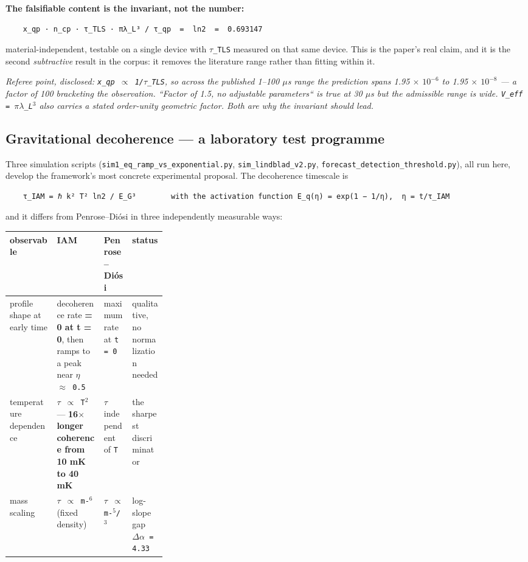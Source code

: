 \documentclass[12pt,a4paper]{article}
\begin{document}
\textbf{The falsifiable content is the invariant, not the number:}


\begin{lstlisting}
    x_qp · n_cp · τ_TLS · πλ_L³ / τ_qp  =  ln2  =  0.693147
\end{lstlisting}


material-independent, testable on a single device with \texttt{$\tau$\_TLS} measured on that same device. This is the paper's real claim, and it is the second \textit{subtractive} result in the corpus: it removes the literature range rather than fitting within it.


\textit{Referee point, disclosed: \texttt{x\_qp $\propto$ 1/$\tau$\_TLS}, so across the published 1--100 $\mu$s range the prediction spans 1.95 $\times$ $10^{-6}$ to 1.95 $\times$ $10^{-8}$ --- a factor of 100 bracketing the observation. ``Factor of 1.5, no adjustable parameters`` is true at 30 $\mu$s but the admissible range is wide. \texttt{V\_eff = $\pi\lambda$\_L$^{3}$} also carries a stated order-unity geometric factor. Both are why the invariant should lead.}







\subsection{Gravitational decoherence --- a laboratory test programme}

Three simulation scripts (\texttt{sim1\_eq\_ramp\_vs\_exponential.py}, \texttt{sim\_lindblad\_v2.py}, \texttt{forecast\_detection\_threshold.py}), all run here, develop the framework's most concrete experimental proposal. The decoherence timescale is


\begin{lstlisting}
    τ_IAM = ℏ k² T² ln2 / E_G³        with the activation function E_q(η) = exp(1 − 1/η),  η = t/τ_IAM
\end{lstlisting}


and it differs from Penrose--Di\'osi in three independently measurable ways:


\begin{small}
\begin{tabularx}{\linewidth}{L{0.30\linewidth}YYY}
\toprule
\textbf{observable} & \textbf{IAM} & \textbf{Penrose--Di\'osi} & \textbf{status} \\
\midrule
profile shape at early time & decoherence rate \textbf{= 0 at t = 0}, then ramps to a peak near \texttt{$\eta$ $\approx$ 0.5} & maximum rate at \texttt{t = 0} & qualitative, no normalization needed \\
temperature dependence & \texttt{$\tau$ $\propto$ T$^{2}$} --- \textbf{16$\times$ longer coherence from 10 mK to 40 mK} & \texttt{$\tau$} independent of \texttt{T} & the sharpest discriminator \\
mass scaling & \texttt{$\tau$ $\propto$ m-$^{6}$} (fixed density) & \texttt{$\tau$ $\propto$ m-$^{5}$/\allowbreak{}$^{3}$} & log-slope gap \texttt{$\Delta\alpha$ = 4.33} \\
\bottomrule
\end{tabularx}
\end{small}
\end{document}
